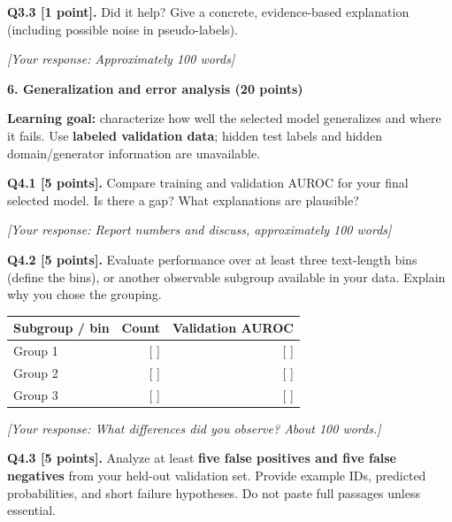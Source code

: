 \documentclass[11pt,letterpaper]{article}
\begin{document}
\vspace{6pt}
\textbf{Q3.3 [1 point].} Did it help? Give a concrete, evidence-based explanation (including possible noise in pseudo-labels).

\textit{[Your response: Approximately 100 words]}

\newpage

{\large\textbf{6. Generalization and error analysis (20 points)}}
\vspace{2pt}

\textbf{Learning goal:} characterize how well the selected model generalizes and where it fails. Use \textbf{labeled validation data}; hidden test labels and hidden domain/generator information are unavailable.

\vspace{6pt}
\textbf{Q4.1 [5 points].} Compare training and validation AUROC for your final selected model. Is there a gap? What explanations are plausible?

\textit{[Your response: Report numbers and discuss, approximately 100 words]}

\vspace{8pt}
\textbf{Q4.2 [5 points].} Evaluate performance over at least three text-length bins (define the bins), or another observable subgroup available in your data. Explain why you chose the grouping.

\vspace{2pt}
\begin{tabularx}{0.7\textwidth}{@{}lrr@{}}
\toprule
\textbf{Subgroup / bin} & \textbf{Count} & \textbf{Validation AUROC} \\
\midrule
Group 1 & [ ] & [ ] \\
Group 2 & [ ] & [ ] \\
Group 3 & [ ] & [ ] \\
\bottomrule
\end{tabularx}

\vspace{2pt}
\textit{[Your response: What differences did you observe? About 100 words.]}

\vspace{8pt}
\textbf{Q4.3 [5 points].} Analyze at least \textbf{five false positives and five false negatives} from your held-out validation set. Provide example IDs, predicted probabilities, and short failure hypotheses. Do not paste full passages unless essential.
\end{document}
